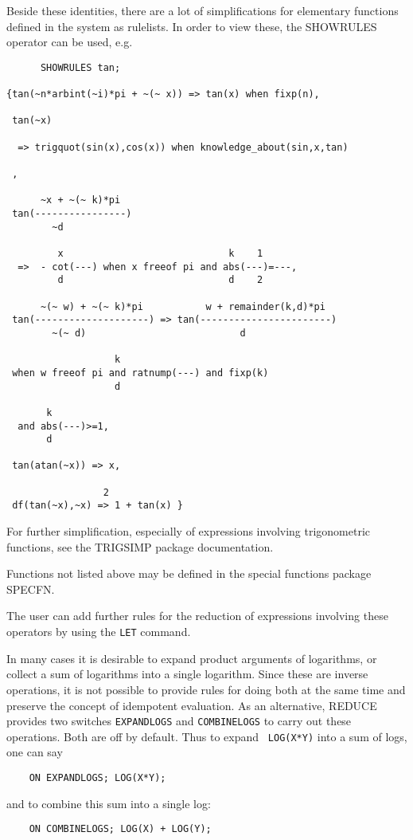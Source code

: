 Beside these identities, there are a lot of simplifications
for elementary functions
defined in the {\REDUCE} system as rulelists. In order to
view these, the SHOWRULES operator can be used, e.g.

\begin{verbatim}
      SHOWRULES tan;

{tan(~n*arbint(~i)*pi + ~(~ x)) => tan(x) when fixp(n),

 tan(~x)

  => trigquot(sin(x),cos(x)) when knowledge_about(sin,x,tan)

 ,

      ~x + ~(~ k)*pi
 tan(----------------)
	    ~d

	     x                             k    1
  =>  - cot(---) when x freeof pi and abs(---)=---,
	     d                             d    2

      ~(~ w) + ~(~ k)*pi           w + remainder(k,d)*pi
 tan(--------------------) => tan(-----------------------)
	    ~(~ d)                           d

			       k
 when w freeof pi and ratnump(---) and fixp(k)
			       d

	   k
  and abs(---)>=1,
	   d

 tan(atan(~x)) => x,

			     2
 df(tan(~x),~x) => 1 + tan(x) }

\end{verbatim}

For further simplification, especially of expressions involving
trigonometric functions, see the TRIGSIMP package
documentation.

Functions not listed above may be defined in the special functions
package SPECFN.

The user can add further rules for the reduction of expressions involving
these operators by using the {\tt LET} command.


In many cases it is desirable to expand product arguments of logarithms,
or collect a sum of logarithms into a single logarithm.  Since these are
inverse operations, it is not possible to provide rules for doing both at
the same time and preserve the {\REDUCE} concept of idempotent evaluation.
As an alternative, REDUCE provides two switches {\tt EXPANDLOGS}
 and {\tt COMBINELOGS} to carry
out these operations.  Both are off by default.  Thus to expand {\tt
LOG(X*Y)} into a sum of logs, one can say
\begin{verbatim}
	ON EXPANDLOGS; LOG(X*Y);
\end{verbatim}
and to combine this sum into a single log:
\begin{verbatim}
	ON COMBINELOGS; LOG(X) + LOG(Y);
\end{verbatim}

